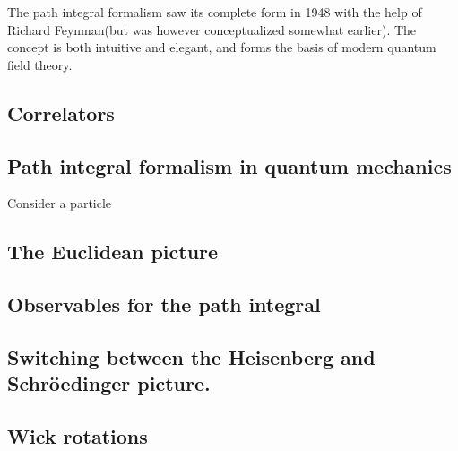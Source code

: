 The path integral formalism saw its complete form in 1948 with the help of Richard Feynman\cite{RevModPhys.20.367}(but was however conceptualized somewhat earlier). The concept is both intuitive and elegant, and forms the basis of modern quantum field theory. 

\subsection{Correlators}

\subsection{Path integral formalism in quantum mechanics}
Consider a particle 

\subsection{The Euclidean picture}

\subsection{Observables for the path integral}

\subsection{Switching between the Heisenberg and Schröedinger picture.}

\subsection{Wick rotations}




